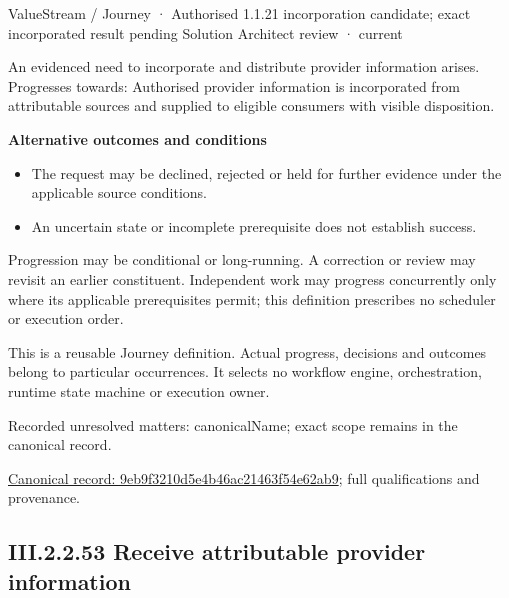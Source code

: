 \label{element:9eb9f3210d5e4b46ac21463f54e62ab9}
{\small ValueStream / Journey · Authorised 1.1.21 incorporation candidate; exact incorporated result pending Solution Architect review · current}\par

An evidenced need to incorporate and distribute provider information arises. Progresses towards: Authorised provider information is incorporated from attributable sources and supplied to eligible consumers with visible disposition.



\par\medskip\textbf{Alternative outcomes and conditions}\par


\begin{itemize}


\item The request may be declined, rejected or held for further evidence under the applicable source conditions.

\item An uncertain state or incomplete prerequisite does not establish success.

\end{itemize}


Progression may be conditional or long-running. A correction or review may revisit an earlier constituent. Independent work may progress concurrently only where its applicable prerequisites permit; this definition prescribes no scheduler or execution order.



This is a reusable Journey definition. Actual progress, decisions and outcomes belong to particular occurrences. It selects no workflow engine, orchestration, runtime state machine or execution owner.


{\small Recorded unresolved matters: canonicalName; exact scope remains in the canonical record.}\par
{\footnotesize \href{../../../../continuum/strategy/value-stream/9eb9f3210d5e4b46ac21463f54e62ab9.md}{Canonical record: 9eb9f3210d5e4b46ac21463f54e62ab9}; full qualifications and provenance.}\par
\subsection*{III.2.2.53 Receive attributable provider information}
\label{navigation:III.2.2.53}

